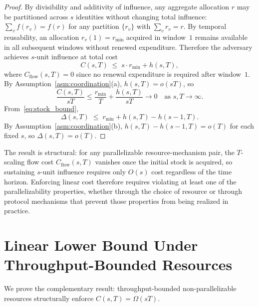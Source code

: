 \documentclass[manuscript,review]{acmart}
\theoremstyle{remark}
\begin{document}
	\begin{proof}
		By divisibility and additivity of influence, any
		aggregate allocation $r$ may be partitioned across
		$s$ identities without changing total influence:
		$\sum_v f(r_v) = f(r)$ for any partition
		$\{r_v\}$ with $\sum_v r_v = r$.
		By temporal reusability, an allocation
		$r_v(1) = r_{\min}$ acquired in window~$1$ remains
		available in all subsequent windows without renewed
		expenditure.
		Therefore the adversary achieves $s$-unit influence
		at total cost
		\begin{equation}
			\label{eq:stock_bound}
			C(s, T) \;\leq\; s \cdot r_{\min} + h(s, T),
		\end{equation}
		where $C_{\mathrm{flow}}(s,T) = 0$ since no renewal
		expenditure is required after window~$1$.
		By Assumption~\ref{asm:coordination}(a),
		$h(s,T) = o(sT)$, so
		\begin{equation}
			\frac{C(s,T)}{sT}
			\leq \frac{r_{\min}}{T} + \frac{h(s,T)}{sT}
			\to 0
			\quad \text{as } s, T \to \infty.
		\end{equation}
		From~\eqref{eq:stock_bound},
		\begin{equation}
			\Delta(s,T) \;\leq\; r_{\min} + h(s,T) - h(s-1,T).
		\end{equation}
		By Assumption~\ref{asm:coordination}(b),
		$h(s,T) - h(s-1,T) = o(T)$ for each fixed $s$,
		so $\Delta(s,T) = o(T)$.
	\end{proof}
	
	The result is structural: for any parallelizable
	resource-mechanism pair, the $T$-scaling flow cost
	$C_{\mathrm{flow}}(s,T)$ vanishes once the initial
	stock is acquired, so sustaining $s$-unit influence
	requires only $O(s)$ cost regardless of the time
	horizon.
	Enforcing linear cost therefore requires violating
	at least one of the parallelizability properties,
	whether through the choice of resource or through
	protocol mechanisms that prevent those properties
	from being realized in practice.
	\section{Linear Lower Bound Under Throughput-Bounded Resources}
	\label{sec:lowerbound}
	
	We prove the complementary result: throughput-bounded
	non-parallelizable resources structurally enforce
	$C(s,T) = \Omega(sT)$.
	
\end{document}
